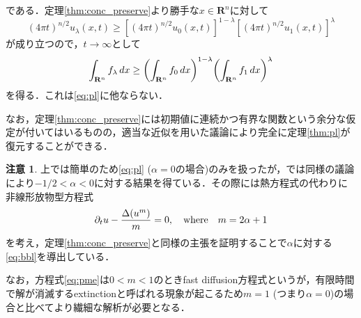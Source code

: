 \documentclass[a4j]{ltjsarticle}
\newcommand{\Rset}{\mathbf{R}}
\newcommand{\1}{\bm{1}}
\numberwithin{equation}{section}
\theoremstyle{definition}
\newtheorem{rmk}[thm]{注意}
\begin{document}
である．定理\ref{thm:conc_preserve}より勝手な$x\in\Rset^n$に対して
\begin{equation}
    (4\pi t)^{n/2}u_{\lambda}(x,t)\geq [(4\pi t)^{n/2}u_0(x,t)]^{1-\lambda}[(4\pi t)^{n/2} u_1(x,t)]^{\lambda}
\end{equation}
が成り立つので，$t\to\infty$として
\begin{equation}
    \int_{\Rset^n}f_\lambda\,dx\geq \qty(\int_{\Rset^n}f_0\,dx)^{1-\lambda}\qty(\int_{\Rset^n}f_1\,dx)^{\lambda}
\end{equation}
を得る．これは\eqref{eq:pl}に他ならない．

なお，定理\ref{thm:conc_preserve}には初期値に連続かつ有界な関数という余分な仮定が付いてはいるものの，適当な近似を用いた議論により完全に定理\ref{thm:pl}が復元することができる．
\begin{rmk}
    上では簡単のため\eqref{eq:pl} ($\alpha=0$の場合)のみを扱ったが，\cite{ILS}では同様の議論により$-1/2<\alpha<0$に対する結果を得ている．その際には熱方程式の代わりに非線形放物型方程式
    \begin{equation}
        \partial_t u-\frac{\Delta\qty(u^m)}{m}=0,\quad \text{where}\quad m=2\alpha+1\label{eq:pme}
    \end{equation}
    を考え，定理\ref{thm:conc_preserve}と同様の主張を証明することで$\alpha$に対する\eqref{eq:bbl}を導出している．

    なお，方程式\eqref{eq:pme}は$0<m<1$のときfast diffusion方程式というが，有限時間で解が消滅するextinctionと呼ばれる現象が起こるため$m=1$ (つまり$\alpha=0$)の場合と比べてより繊細な解析が必要となる．
\end{rmk}
\end{document}
